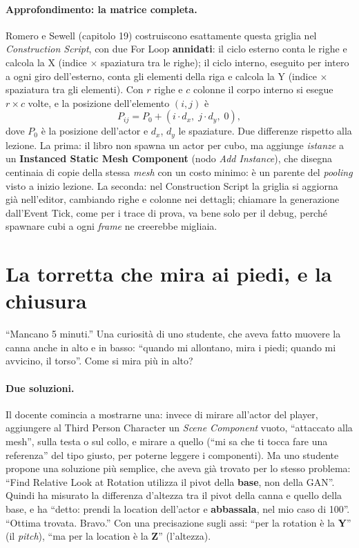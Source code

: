\paragraph{Approfondimento: la matrice completa.} Romero e Sewell (capitolo 19) costruiscono
esattamente questa griglia nel \emph{Construction Script}, con due For Loop
\textbf{annidati}: il ciclo esterno conta le righe e calcola la X (indice $\times$
spaziatura tra le righe); il ciclo interno, eseguito per intero a ogni giro
dell'esterno, conta gli elementi della riga e calcola la Y (indice $\times$ spaziatura
tra gli elementi). Con $r$ righe e $c$ colonne il corpo interno si esegue $r \times c$
volte, e la posizione dell'elemento $(i, j)$ è
\[
  P_{ij} = P_0 + (i \cdot d_x,\; j \cdot d_y,\; 0),
\]
dove $P_0$ è la posizione dell'actor e $d_x$, $d_y$ le spaziature. Due differenze
rispetto alla lezione. La prima: il libro non spawna un actor per cubo, ma aggiunge
\emph{istanze} a un \textbf{Instanced Static Mesh Component} (nodo \emph{Add Instance}),
che disegna centinaia di copie della stessa \emph{mesh} con un costo minimo: è un
parente del \emph{pooling} visto a inizio lezione. La seconda: nel Construction Script
la griglia si aggiorna già nell'editor, cambiando righe e colonne nei dettagli; chiamare
la generazione dall'Event Tick, come per i trace di prova, va bene solo per il debug,
perché spawnare cubi a ogni \emph{frame} ne creerebbe migliaia.

\section{La torretta che mira ai piedi, e la chiusura}
\label{ue5:sec:chiusura}

``Mancano 5 minuti.'' Una curiosità di uno studente, che aveva fatto muovere la canna
anche in alto e in basso: ``quando mi allontano, mira i piedi; quando mi avvicino, il
torso''. Come si mira più in alto?

\paragraph{Due soluzioni.} Il docente comincia a mostrarne una: invece di mirare
all'actor del player, aggiungere al Third Person Character un \emph{Scene Component}
vuoto, ``attaccato alla mesh'', sulla testa o sul collo, e mirare a quello (``mi sa che
ti tocca fare una referenza'' del tipo giusto, per poterne leggere i componenti). Ma uno
studente propone una soluzione più semplice, che aveva già trovato per lo stesso
problema: ``Find Relative Look at Rotation utilizza il pivot della \textbf{base}, non della
GAN''. Quindi ha misurato la differenza d'altezza tra il pivot della canna e quello della
base, e ha ``detto: prendi la location dell'actor e \textbf{abbassala}, nel mio caso di
100''. ``Ottima trovata. Bravo.'' Con una precisazione sugli assi: ``per la rotation è la
\textbf{Y}'' (il \emph{pitch}), ``ma per la location è la \textbf{Z}'' (l'altezza).

